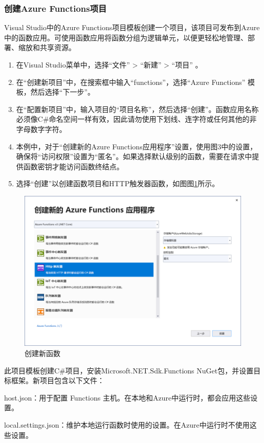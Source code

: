 \documentclass[11pt]{article}
\begin{document}
\subsubsection{创建Azure Functions项目}
Visual Studio中的Azure Functions项目模板创建一个项目，该项目可发布到Azure中的函数应用。可使用函数应用将函数分组为逻辑单元，以便更轻松地管理、部署、缩放和共享资源。
\begin{enumerate}
	\item 在Visual Studio菜单中，选择“文件” > “新建” > “项目” 。
	\item 在“创建新项目”中，在搜索框中输入“functions”，选择“Azure Functions” 模板，然后选择“下一步”。
	\item 在“配置新项目”中，输入项目的“项目名称”，然后选择“创建”。函数应用名称必须像C\#命名空间一样有效，因此请勿使用下划线、连字符或任何其他的非字母数字字符。
	\item 本例中，对于“创建新的Azure Functions应用程序”设置，使用图3中的设置，确保将“访问权限”设置为“匿名”。如果选择默认级别的函数，需要在请求中提供函数密钥才能访问函数终结点。
	\item 选择“创建”以创建函数项目和HTTP触发器函数，如图图\ref{fig3}所示。
\end{enumerate}
\begin{figure}[h]	
	\centering
	\includegraphics[scale=0.6]{figs/3.png}        %
	\caption{创建新函数}
	\label{fig3}	
\end{figure}
此项目模板创建C\#项目，安装Microsoft.NET.Sdk.Functions NuGet包，并设置目标框架。新项目包含以下文件：

host.json：用于配置 Functions 主机。在本地和Azure中运行时，都会应用这些设置。

local.settings.json：维护本地运行函数时使用的设置。在Azure中运行时不使用这些设置。
\end{document}
